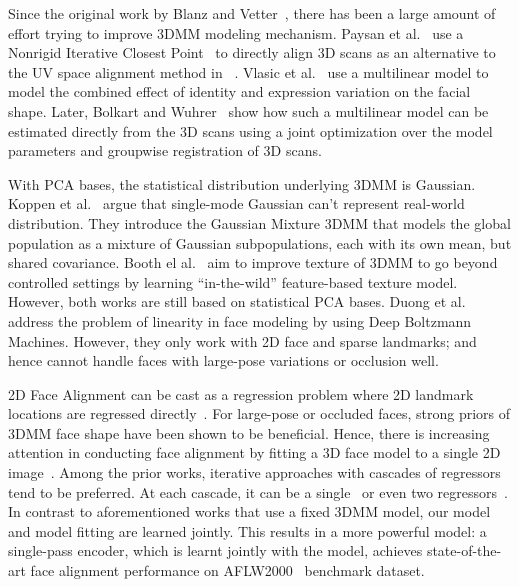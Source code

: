 \label{sec:prior}

Since the original work by Blanz and Vetter~\cite{blanz1999morphable}, there has been a large amount of effort trying to improve 3DMM modeling mechanism.
Paysan et al.~\cite{paysan20093d} use a Nonrigid Iterative Closest Point~\cite{amberg2007optimal} to directly align 3D scans as an alternative to the UV space alignment method in ~\cite{blanz1999morphable}.
Vlasic et al.~\cite{vlasic2005face} use a multilinear model to model the combined effect of identity and expression variation on the facial shape.
Later, Bolkart and Wuhrer~\cite{bolkart2015groupwise} show how such a multilinear model can be estimated directly from the 3D scans using a joint optimization over the model parameters and groupwise registration of 3D scans.

With PCA bases, the statistical distribution underlying 3DMM is Gaussian. Koppen et al.~\cite{koppen2017gaussian} argue that single-mode Gaussian can't represent real-world distribution. They introduce the Gaussian Mixture 3DMM that models the global population as a mixture of Gaussian subpopulations, each with its own mean, but shared covariance.
Booth el al.~\cite{booth20173d} aim to improve texture of 3DMM to go beyond controlled settings by learning “in-the-wild” feature-based texture model.
However, both works are still based on statistical PCA bases.
Duong et al.~\cite{nhan2015beyond} address the problem of linearity in face modeling by using Deep Boltzmann Machines. However, they only work with 2D face and sparse landmarks; and hence cannot handle faces with large-pose variations or occlusion well.

2D Face Alignment can be cast as a regression problem where 2D landmark locations are regressed directly~\cite{dollar2010cascaded}. 
For large-pose or occluded faces, strong priors of 3DMM face shape have been shown to be beneficial. 
Hence, there is increasing attention in conducting face alignment by fitting a 3D face model to a single 2D image~\cite{jourabloo2015pose, jourabloo2016large, zhu2016face, liu2016joint, mcdonagh2016joint,  jourabloo2017pose, jourabloo2017poseinvariant}. 
Among the prior works, iterative approaches with cascades of regressors tend to be preferred. 
At each cascade, it can be a single~\cite{tulyakov2015regressing, jourabloo2015pose} or even two regressors~\cite{wu2015robust}. 
In contrast to aforementioned works that use a fixed 3DMM model, our model and model fitting are learned jointly. 
This results in a more powerful model: a single-pass encoder, which is learnt jointly with the model, achieves state-of-the-art face alignment performance on AFLW2000~\cite{zhu2016face} benchmark dataset.  %

